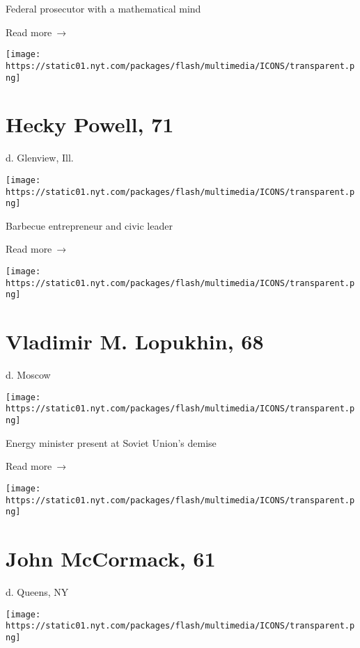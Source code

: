 Federal prosecutor with a mathematical mind

 Read more~→

\href{https://www.nytimes.com/2020/06/04/us/hecky-powell-dead-coronavirus.html}{}

\texttt{[image: https://static01.nyt.com/packages/flash/multimedia/ICONS/transparent.png]}

\hypertarget{hecky-powell-71}{%
\section{Hecky Powell, 71}\label{hecky-powell-71}}

d. Glenview, Ill.

\texttt{[image: https://static01.nyt.com/packages/flash/multimedia/ICONS/transparent.png]}

Barbecue entrepreneur and civic leader

 Read more~→

\href{https://www.nytimes.com/2020/06/04/obituaries/vladimir-lopukhin-dead-coronavirus.html}{}

\texttt{[image: https://static01.nyt.com/packages/flash/multimedia/ICONS/transparent.png]}

\hypertarget{vladimir-m-lopukhin-68}{%
\section{Vladimir M. Lopukhin, 68}\label{vladimir-m-lopukhin-68}}

d. Moscow

\texttt{[image: https://static01.nyt.com/packages/flash/multimedia/ICONS/transparent.png]}

Energy minister present at Soviet Union's demise

 Read more~→

\href{https://www.nytimes.com/2020/06/04/obituaries/00john-mccormack-dead-coronavirus.html}{}

\texttt{[image: https://static01.nyt.com/packages/flash/multimedia/ICONS/transparent.png]}

\hypertarget{john-mccormack-61}{%
\section{John McCormack, 61}\label{john-mccormack-61}}

d. Queens, NY

\texttt{[image: https://static01.nyt.com/packages/flash/multimedia/ICONS/transparent.png]}


